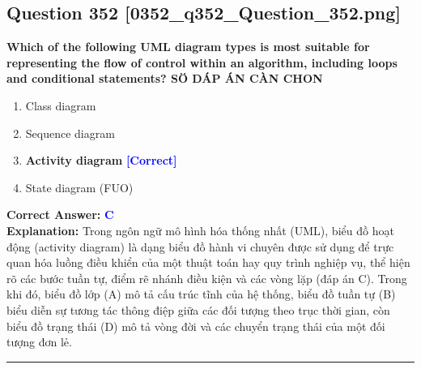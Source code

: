 \documentclass[11pt,a4paper]{article}
\begin{document}
\begin{minipage}{\textwidth}
\subsection*{Question 352 \quad \footnotesize{[0352\_q352\_Question\_352.png]}}
\noindent \textbf{Which of the following UML diagram types is most suitable for representing the flow of control within an algorithm, including loops and conditional statements? SÖ DÁP ÁN CÀN CHON}

\begin{enumerate}[label=\Alph*.]
    \item Class diagram
    \item Sequence diagram
    \item \textbf{Activity diagram} \hfill \textcolor{blue}{\textbf{[Correct]}}
    \item State diagram (FUO)
\end{enumerate}

\noindent \textbf{Correct Answer:} \textcolor{blue}{\textbf{C}} \\[2pt]
\noindent \textbf{Explanation:} Trong ngôn ngữ mô hình hóa thống nhất (UML), biểu đồ hoạt động (activity diagram) là dạng biểu đồ hành vi chuyên được sử dụng để trực quan hóa luồng điều khiển của một thuật toán hay quy trình nghiệp vụ, thể hiện rõ các bước tuần tự, điểm rẽ nhánh điều kiện và các vòng lặp (đáp án C). Trong khi đó, biểu đồ lớp (A) mô tả cấu trúc tĩnh của hệ thống, biểu đồ tuần tự (B) biểu diễn sự tương tác thông điệp giữa các đối tượng theo trục thời gian, còn biểu đồ trạng thái (D) mô tả vòng đời và các chuyển trạng thái của một đối tượng đơn lẻ.

\par\vspace{0.3cm}
\hrule
\vspace{0.3cm}
\end{minipage}
\end{document}
